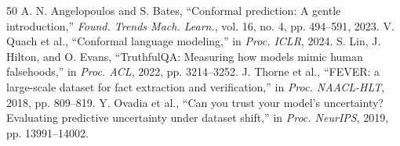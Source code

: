 \documentclass[10pt,conference]{IEEEtran}
\begin{document}
\begin{thebibliography}{50}
 A. N. Angelopoulos and S. Bates, ``Conformal prediction: A gentle introduction,'' \emph{Found. Trends Mach. Learn.}, vol. 16, no. 4, pp. 494--591, 2023.
 V. Quach et al., ``Conformal language modeling,'' in \emph{Proc. ICLR}, 2024.
 S. Lin, J. Hilton, and O. Evans, ``TruthfulQA: Measuring how models mimic human falsehoods,'' in \emph{Proc. ACL}, 2022, pp. 3214--3252.
 J. Thorne et al., ``FEVER: a large-scale dataset for fact extraction and verification,'' in \emph{Proc. NAACL-HLT}, 2018, pp. 809--819.
 Y. Ovadia et al., ``Can you trust your model's uncertainty? Evaluating predictive uncertainty under dataset shift,'' in \emph{Proc. NeurIPS}, 2019, pp. 13991--14002.
\end{thebibliography}
\end{document}
